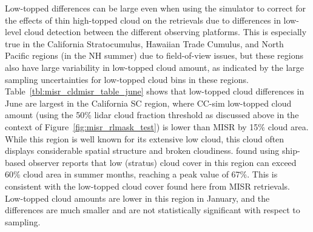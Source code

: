 Low-topped differences can be large even when using the simulator to
correct for the effects of thin high-topped cloud on the retrievals due
to differences in low-level cloud detection between the different
observing platforms. This is especially true in the California
Stratocumulus, Hawaiian Trade Cumulus, and North Pacific regions (in the
NH summer) due to field-of-view issues, but these regions also have
large variability in low-topped cloud amount, as indicated by the large
sampling uncertainties for low-topped cloud bins in these regions.
Table~\ref{tbl:misr_cldmisr_table_june} shows that low-topped cloud
differences in June are largest in the California SC region, where
CC-sim low-topped cloud amount (using the 50\% lidar cloud fraction
threshold as discussed above in the context of
Figure~\ref{fig:misr_rlmask_test}) is lower than MISR by 15\% cloud
area. While this region is well known for its extensive low cloud, this
cloud often displays considerable spatial structure and broken
cloudiness. \citet{klein_and_hartmann_1993} found using ship-based
observer reports
\citep[following][]{warren_et_al_1986, warren_et_al_1988} that low
(stratus) cloud cover in this region can exceed 60\% cloud area in
summer months, reaching a peak value of 67\%. This is consistent with
the low-topped cloud cover found here from MISR retrievals. Low-topped
cloud amounts are lower in this region in January, and the differences
are much smaller and are not statistically significant with respect to
sampling.

